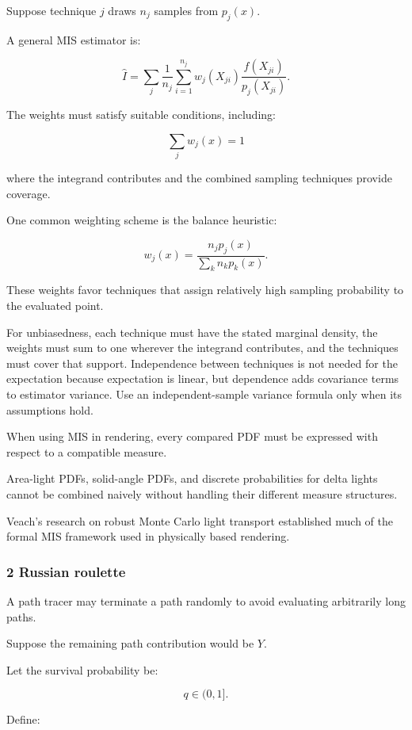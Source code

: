 Suppose technique \(j\) draws \(n_j\) samples from \(p_j(x)\).

A general MIS estimator is:

\[
 \boxed{ \widehat I= \sum_j\frac1{n_j} \sum_{i=1}^{n_j} w_j(X_{ji}) \frac{f(X_{ji})}{p_j(X_{ji})} }.
\]

The weights must satisfy suitable conditions, including:

\[
 \sum_jw_j(x)=1
\]

where the integrand contributes and the combined sampling techniques provide coverage.

One common weighting scheme is the balance heuristic:

\[
 \boxed{ w_j(x)= \frac{n_jp_j(x)} {\sum_kn_kp_k(x)} }.
\]

These weights favor techniques that assign relatively high sampling probability to the evaluated point.

For unbiasedness, each technique must have the stated marginal density, the weights must sum to one wherever the integrand contributes, and the techniques must cover that support. Independence between techniques is not needed for the expectation because expectation is linear, but dependence adds covariance terms to estimator variance. Use an independent-sample variance formula only when its assumptions hold.

When using MIS in rendering, every compared PDF must be expressed with respect to a compatible measure.

Area-light PDFs, solid-angle PDFs, and discrete probabilities for delta lights cannot be combined naively without handling their different measure structures.

Veach's research on robust Monte Carlo light transport established much of the formal MIS framework used in physically based rendering.

\subsubsection{2 Russian roulette}\label{02-foundations-ii-ch031-russian-roulette}

A path tracer may terminate a path randomly to avoid evaluating arbitrarily long paths.

Suppose the remaining path contribution would be \(Y\).

Let the survival probability be:

\[
 q\in(0,1].
\]

Define:

